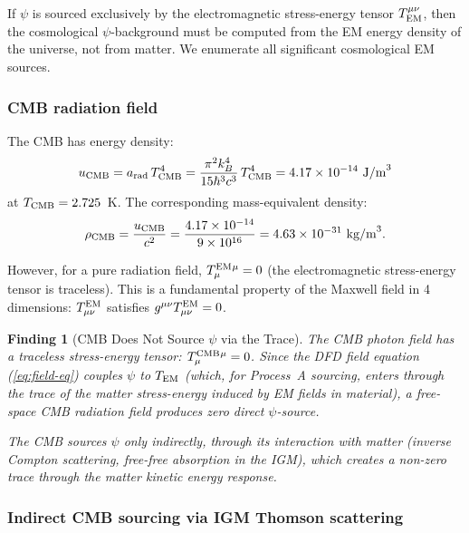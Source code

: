 \documentclass[11pt]{article}
\newtheorem{finding}{Finding}
\newcommand{\ee}[1]{\times 10^{#1}}
\begin{document}
If $\psi$ is sourced exclusively by the electromagnetic stress-energy tensor
$T_{\rm EM}^{\mu\nu}$, then the cosmological $\psi$-background must be
computed from the EM energy density of the universe, not from matter.
We enumerate all significant cosmological EM sources.

\subsubsection{CMB radiation field}

The CMB has energy density:
\begin{equation}
u_{\rm CMB} = a_{\rm rad}\,T_{\rm CMB}^4
= \frac{\pi^2 k_B^4}{15\hbar^3 c^3}\,T_{\rm CMB}^4
= 4.17\ee{-14}~\text{J/m}^3
\label{eq:u-CMB}
\end{equation}
at $T_{\rm CMB} = 2.725$~K. The corresponding mass-equivalent density:
\begin{equation}
\rho_{\rm CMB} = \frac{u_{\rm CMB}}{c^2} = \frac{4.17\ee{-14}}{9\ee{16}}
= 4.63\ee{-31}~\text{kg/m}^3.
\label{eq:rho-CMB}
\end{equation}

However, for a pure radiation field, $T^{\rm EM}_{\mu}{}^{\mu} = 0$ (the
electromagnetic stress-energy tensor is traceless). This is a fundamental
property of the Maxwell field in 4 dimensions: $T^{\rm EM}_{\mu\nu}$
satisfies $g^{\mu\nu}T^{\rm EM}_{\mu\nu} = 0$.

\begin{finding}[CMB Does Not Source $\psi$ via the Trace]
\label{find:CMB-traceless}
The CMB photon field has a traceless stress-energy tensor:
$T^{\rm CMB}_{\mu}{}^{\mu} = 0$. Since the DFD field equation
(\ref{eq:field-eq}) couples $\psi$ to $T_{\rm EM}$ (which, for
Process~A sourcing, enters through the trace of the matter
stress-energy induced by EM fields in material), a free-space
CMB radiation field produces \emph{zero} direct $\psi$-source.

The CMB sources $\psi$ only indirectly, through its interaction with
matter (inverse Compton scattering, free-free absorption in the IGM),
which creates a non-zero trace through the matter kinetic energy response.
\end{finding}

\subsubsection{Indirect CMB sourcing via IGM Thomson scattering}
\end{document}
